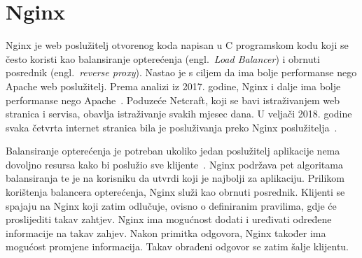 \section{Nginx}
Nginx je web poslužitelj otvorenog koda napisan u C programskom kodu koji se često koristi kao
balansiranje opterećenja (engl.~\textit{Load Balancer}) i obrnuti posrednik (engl.~\textit{reverse
proxy}). Nastao je s ciljem da ima bolje performanse nego Apache web poslužitelj.  Prema analizi iz
2017. godine, Nginx i dalje ima bolje performanse nego Apache~\citep{nguyen2017comparative}.
Poduzeće Netcraft, koji se bavi istraživanjem web stranica i servisa, obavlja istraživanje svakih
mjesec dana. U veljači 2018. godine svaka četvrta internet stranica bila je posluživanja preko Nginx
poslužitelja~\citep{Netcraft2018}.

Balansiranje opterećenja je potreban ukoliko jedan poslužitelj aplikacije nema dovoljno resursa kako
bi poslužio sve klijente~\citep{soni2016load}. Nginx podržava pet algoritama balansiranja te je na
korisniku da utvrdi koji je najbolji za aplikaciju. Prilikom korištenja balancera opterećenja, Nginx
služi kao obrnuti posrednik. Klijenti se spajaju na Nginx koji zatim odlučuje, ovisno o definiranim
pravilima, gdje će proslijediti takav zahtjev. Nginx ima mogućnost dodati i uređivati određene
informacije na takav zahjev. Nakon primitka odgovora, Nginx također ima mogućost promjene
informacija. Takav obrađeni odgovor se zatim šalje klijentu.
